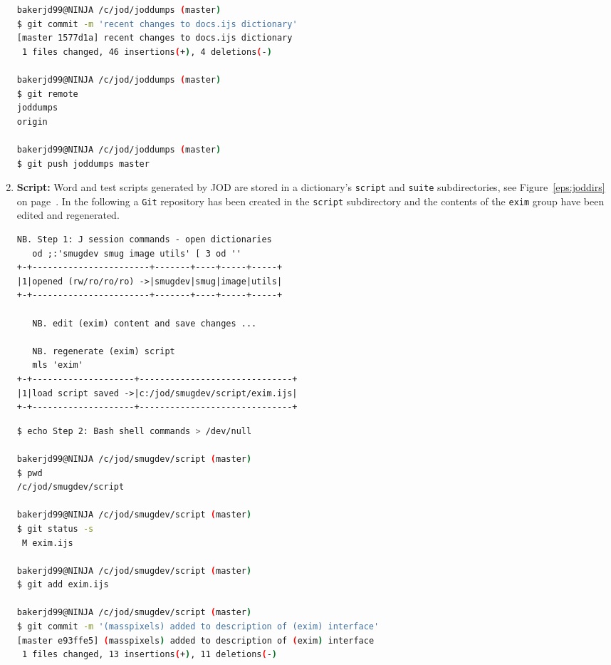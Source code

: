 \begin{enumerate}
\begin{lstlisting}[language=bash,frame=single,framerule=0pt
,basicstyle=\ttfamily\footnotesize,backgroundcolor=\color{CodeBackGround}]
bakerjd99@NINJA /c/jod/joddumps (master)
$ git commit -m 'recent changes to docs.ijs dictionary'
[master 1577d1a] recent changes to docs.ijs dictionary
 1 files changed, 46 insertions(+), 4 deletions(-)
 
bakerjd99@NINJA /c/jod/joddumps (master) 
$ git remote
joddumps
origin

bakerjd99@NINJA /c/jod/joddumps (master) 
$ git push joddumps master 
\end{lstlisting}

\item \textbf{Script:} Word and test scripts generated by JOD are stored
in a dictionary's  \texttt{script} and \texttt{suite} subdirectories, see Figure~\ref{eps:joddirs} on page~\pageref{eps:joddirs}.
In the following a \texttt{Git} repository has been created in the \texttt{script} subdirectory
and the contents of the \texttt{exim} group have been edited and regenerated.

\begin{lstlisting}[frame=single,framerule=0pt,basicstyle=\ttfamily\footnotesize]
   NB. Step 1: J session commands - open dictionaries
   od ;:'smugdev smug image utils' [ 3 od ''
+-+-----------------------+-------+----+-----+-----+
|1|opened (rw/ro/ro/ro) ->|smugdev|smug|image|utils|
+-+-----------------------+-------+----+-----+-----+

   NB. edit (exim) content and save changes ...
   
   NB. regenerate (exim) script
   mls 'exim'
+-+--------------------+------------------------------+
|1|load script saved ->|c:/jod/smugdev/script/exim.ijs|
+-+--------------------+------------------------------+
\end{lstlisting}

\begin{lstlisting}[language=bash,frame=single,framerule=0pt
,basicstyle=\ttfamily\footnotesize,backgroundcolor=\color{CodeBackGround}]
$ echo Step 2: Bash shell commands > /dev/null

bakerjd99@NINJA /c/jod/smugdev/script (master)
$ pwd
/c/jod/smugdev/script

bakerjd99@NINJA /c/jod/smugdev/script (master)
$ git status -s
 M exim.ijs

bakerjd99@NINJA /c/jod/smugdev/script (master)
$ git add exim.ijs

bakerjd99@NINJA /c/jod/smugdev/script (master)
$ git commit -m '(masspixels) added to description of (exim) interface'
[master e93ffe5] (masspixels) added to description of (exim) interface
 1 files changed, 13 insertions(+), 11 deletions(-)
\end{lstlisting}


\end{enumerate}
